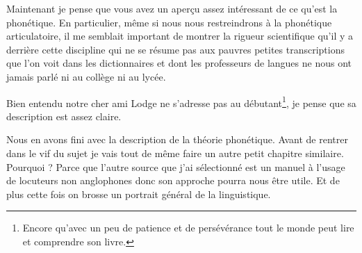 Maintenant je pense que vous avez un aperçu assez intéressant de ce
qu'est la phonétique. En particulier, même si nous nous restreindrons
à la phonétique articulatoire, il me semblait important de montrer la
rigueur scientifique qu'il y a derrière cette discipline qui ne se
résume pas aux pauvres petites transcriptions que l'on voit dans les
dictionnaires et dont les professeurs de langues ne nous ont jamais
parlé ni au collège ni au lycée.

Bien entendu notre cher ami Lodge ne s'adresse pas au
débutant\footnote{Encore qu'avec un peu de patience et de persévérance
tout le monde peut lire et comprendre son livre.}, je pense que sa
description est assez claire.

Nous en avons fini avec la description de la théorie phonétique. Avant
de rentrer dans le vif du sujet je vais tout de même faire un autre
petit chapitre similaire. Pourquoi ? Parce que l'autre source que j'ai
sélectionné est un manuel à l'usage de locuteurs non anglophones donc
son approche pourra nous être utile. Et de plus cette fois on brosse
un portrait général de la linguistique.

\newpage
\minitoc
\newpage

